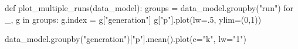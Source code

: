 \documentclass[
  a4paperpaper,
  ,captions=tableheading
]{scrbook}
\newenvironment{Shaded}{\begin{snugshade}}{\end{snugshade}}
\newcommand{\ControlFlowTok}[1]{\textcolor[rgb]{0.00,0.23,0.31}{#1}}
\newcommand{\DecValTok}[1]{\textcolor[rgb]{0.68,0.00,0.00}{#1}}
\newcommand{\FloatTok}[1]{\textcolor[rgb]{0.68,0.00,0.00}{#1}}
\newcommand{\KeywordTok}[1]{\textcolor[rgb]{0.00,0.23,0.31}{#1}}
\newcommand{\NormalTok}[1]{\textcolor[rgb]{0.00,0.23,0.31}{#1}}
\newcommand{\OperatorTok}[1]{\textcolor[rgb]{0.37,0.37,0.37}{#1}}
\newcommand{\StringTok}[1]{\textcolor[rgb]{0.13,0.47,0.30}{#1}}
\begin{document}
\begin{Shaded}
\begin{Highlighting}[]
\KeywordTok{def}\NormalTok{ plot\_multiple\_runs(data\_model):}
\NormalTok{    groups }\OperatorTok{=}\NormalTok{ data\_model.groupby(}\StringTok{"run"}\NormalTok{)}
    \ControlFlowTok{for}\NormalTok{ \_, g }\KeywordTok{in}\NormalTok{ groups:}
\NormalTok{        g.index }\OperatorTok{=}\NormalTok{ g[}\StringTok{"generation"}\NormalTok{]}
\NormalTok{        g[}\StringTok{"p"}\NormalTok{].plot(lw}\OperatorTok{=}\FloatTok{.5}\NormalTok{, ylim}\OperatorTok{=}\NormalTok{(}\DecValTok{0}\NormalTok{,}\DecValTok{1}\NormalTok{))}

\NormalTok{    data\_model.groupby(}\StringTok{"generation"}\NormalTok{)[}\StringTok{"p"}\NormalTok{].mean().plot(c}\OperatorTok{=}\StringTok{"k"}\NormalTok{, lw}\OperatorTok{=}\StringTok{"1"}\NormalTok{)}
\end{Highlighting}
\end{Shaded}
\end{document}
